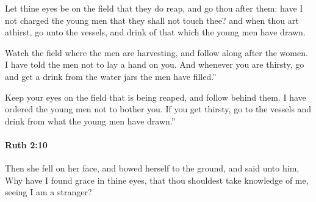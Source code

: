 			\begin{versebox}
					\item[BHS] 
					\item[LXX] 
					\item[ASV] Let thine eyes be on the field that they do reap, and go thou after them: have I not charged the young men that they shall not touch thee? and when thou art athirst, go unto the vessels, and drink of that which the young men have drawn.
					\item[NIV] Watch the field where the men are harvesting, and follow along after the women. I have told the men not to lay a hand on you. And whenever you are thirsty, go and get a drink from the water jars the men have filled.”
					\item[NRSV] Keep your eyes on the field that is being reaped, and follow behind them. I have ordered the young men not to bother you. If you get thirsty, go to the vessels and drink from what the young men have drawn.”
			\end{versebox}

		\paragraph{Ruth 2:10} %
			\label{RUTH-2-10}

			Then she fell on her face, and bowed herself to the ground, and said unto him, Why have I found grace in thine eyes, that thou shouldest take knowledge of me, seeing I am a stranger?

